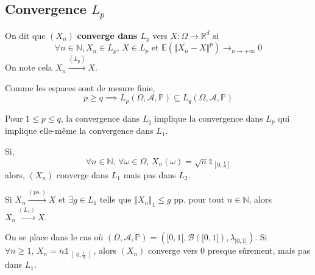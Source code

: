   \subsection{Convergence \texorpdfstring{$L_p$}{Lp}}


  \begin{definition}
    On dit que $(X_n)$ \textbf{converge dans $L_p$} vers $X : \Omega \rightarrow \mathbb{R}^d$ si
    \[ \forall n \in \mathbb{N}, X_n \in L_p, \, X \in L_p \text{ et } \mathbb{E}(\Vert X_n - X \Vert^p) \longrightarrow_{n\rightarrow+\infty}0 \]
    On note cela $X_n \overset{(L_p)}{\longrightarrow} X$.
  \end{definition}


  \begin{proposition}
    Comme les espaces sont de mesure finie,
    \[ p \geq q \implies L_p(\Omega, \mathcal{A}, \mathbb{P}) \subseteq L_q(\Omega, \mathcal{A}, \mathbb{P}) \]
  \end{proposition}

  \begin{corollary}
    Pour $1 \leq p \leq q$, la convergence dans $L_q$ implique la convergence dans $L_p$ qui implique elle-même la convergence dans $L_1$.
  \end{corollary}


  \begin{cexample}
    Si,
    \[
      \forall n \in \mathbb{N}, \, \forall \omega \in \Omega, \, X_n(\omega) = \sqrt{n} \mathbb{1}_{\left[ 0, \frac{1}{n} \right]}
    \]
    alors, $(X_n)$ converge dans $L_1$ mais pas dans $L_2$.
  \end{cexample}


  \begin{theorem}
    Si $X_n \overset{(ps.)}{\longrightarrow} X$ et $\exists g \in L_1$ telle que $\Vert X_n \Vert_1 \leq g$ pp. pour tout $n \in \mathbb{N}$, alors $X_n \overset{(L_1)}{\longrightarrow} X$.
  \end{theorem}


  \begin{cexample}
    On se place dans le cas où $(\Omega, \mathcal{A}, \mathbb{P}) = ([0,1[, \mathcal{B}([0,1[), \lambda_{[0,1[})$. Si $\forall n \geq 1, \, X_n = n \mathbb{1}_{\left] 0, \frac{1}{n} \right[}$, alors $(X_n)$ converge vers $0$ presque sûrement, mais pas dans $L_1$.
  \end{cexample}

